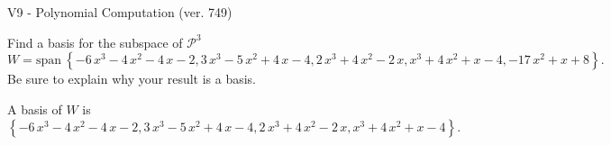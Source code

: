 \begin{exercise}
  \begin{exerciseTitle}V9 - Polynomial Computation (ver. 749)\end{exerciseTitle}
  \begin{exerciseStatement}
    Find a basis for the subspace of \(\mathcal{P}^3\) 
\[W=\mathrm{span}\ \left\{-6 \, x^{3} - 4 \, x^{2} - 4 \, x - 2 , 3 \, x^{3} - 5 \, x^{2} + 4 \, x - 4 , 2 \, x^{3} + 4 \, x^{2} - 2 \, x , x^{3} + 4 \, x^{2} + x - 4 , -17 \, x^{2} + x + 8\right\}.\]
 Be sure to explain why your result is a basis.


  \end{exerciseStatement}
  \begin{exerciseAnswer}
   A basis of \(W\) is  \(\left\{-6 \, x^{3} - 4 \, x^{2} - 4 \, x - 2 , 3 \, x^{3} - 5 \, x^{2} + 4 \, x - 4 , 2 \, x^{3} + 4 \, x^{2} - 2 \, x , x^{3} + 4 \, x^{2} + x - 4\right\}\).
  


  \end{exerciseAnswer}
\end{exercise}